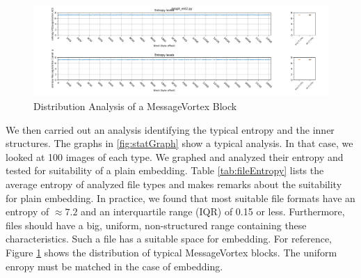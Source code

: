\begin{figure}[ht]
	\includegraphics[width=\textwidth]{inc/statanalysis_mv}
	\caption{Distribution Analysis of a MessageVortex Block}
	\label{fig:statMvGraph}
\end{figure}

We then carried out an analysis identifying the typical entropy and the inner structures. The graphs in \ref{fig:statGraph} show a typical analysis. In that case, we looked at 100 images of each type. We graphed and analyzed their entropy and tested for suitability of a plain embedding. Table \ref{tab:fileEntropy} lists the average entropy of analyzed file types and makes remarks about the suitability for plain embedding. In practice, we found that most suitable file formats have an entropy of $\approx 7.2$ and an interquartile range (IQR) of 0.15 or less. Furthermore, files should have a big, uniform, non-structured range containing these characteristics. Such a file has a suitable space for embedding. For reference, Figure \ref{fig:statMvGraph} shows the distribution of typical MessageVortex blocks. The uniform enropy must be matched in the case of embedding.

